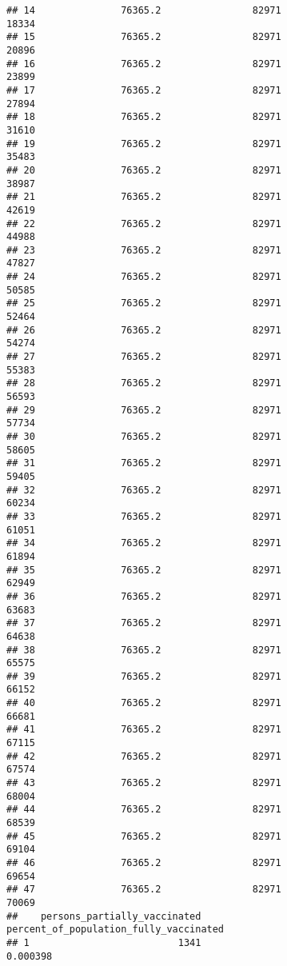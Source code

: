 \documentclass[
]{article}
\begin{document}
\begin{verbatim}
## 14               76365.2                82971                    18334
## 15               76365.2                82971                    20896
## 16               76365.2                82971                    23899
## 17               76365.2                82971                    27894
## 18               76365.2                82971                    31610
## 19               76365.2                82971                    35483
## 20               76365.2                82971                    38987
## 21               76365.2                82971                    42619
## 22               76365.2                82971                    44988
## 23               76365.2                82971                    47827
## 24               76365.2                82971                    50585
## 25               76365.2                82971                    52464
## 26               76365.2                82971                    54274
## 27               76365.2                82971                    55383
## 28               76365.2                82971                    56593
## 29               76365.2                82971                    57734
## 30               76365.2                82971                    58605
## 31               76365.2                82971                    59405
## 32               76365.2                82971                    60234
## 33               76365.2                82971                    61051
## 34               76365.2                82971                    61894
## 35               76365.2                82971                    62949
## 36               76365.2                82971                    63683
## 37               76365.2                82971                    64638
## 38               76365.2                82971                    65575
## 39               76365.2                82971                    66152
## 40               76365.2                82971                    66681
## 41               76365.2                82971                    67115
## 42               76365.2                82971                    67574
## 43               76365.2                82971                    68004
## 44               76365.2                82971                    68539
## 45               76365.2                82971                    69104
## 46               76365.2                82971                    69654
## 47               76365.2                82971                    70069
##    persons_partially_vaccinated percent_of_population_fully_vaccinated
## 1                          1341                               0.000398

\end{verbatim}
\end{document}
